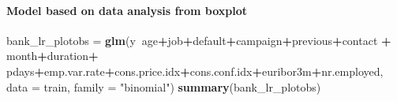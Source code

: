 \documentclass[
]{article}
\newenvironment{Shaded}{\begin{snugshade}}{\end{snugshade}}
\newcommand{\DataTypeTok}[1]{\textcolor[rgb]{0.13,0.29,0.53}{#1}}
\newcommand{\KeywordTok}[1]{\textcolor[rgb]{0.13,0.29,0.53}{\textbf{#1}}}
\newcommand{\NormalTok}[1]{#1}
\newcommand{\OperatorTok}[1]{\textcolor[rgb]{0.81,0.36,0.00}{\textbf{#1}}}
\newcommand{\StringTok}[1]{\textcolor[rgb]{0.31,0.60,0.02}{#1}}
\begin{document}
\hypertarget{model-based-on-data-analysis-from-boxplot}{%
\paragraph{Model based on data analysis from
boxplot}\label{model-based-on-data-analysis-from-boxplot}}

\begin{Shaded}
\begin{Highlighting}[]
\NormalTok{bank_lr_plotobs =}\StringTok{ }\KeywordTok{glm}\NormalTok{(y}\OperatorTok{~}\NormalTok{age}\OperatorTok{+}\NormalTok{job}\OperatorTok{+}\NormalTok{default}\OperatorTok{+}\NormalTok{campaign}\OperatorTok{+}\NormalTok{previous}\OperatorTok{+}\NormalTok{contact }\OperatorTok{+}\StringTok{ }\NormalTok{month}\OperatorTok{+}\NormalTok{duration}\OperatorTok{+}\StringTok{ }\NormalTok{pdays}\OperatorTok{+}\NormalTok{emp.var.rate}\OperatorTok{+}\NormalTok{cons.price.idx}\OperatorTok{+}\NormalTok{cons.conf.idx}\OperatorTok{+}\NormalTok{euribor3m}\OperatorTok{+}\NormalTok{nr.employed, }\DataTypeTok{data =}\NormalTok{ train,}
                      \DataTypeTok{family =} \StringTok{"binomial"}\NormalTok{)}
\KeywordTok{summary}\NormalTok{(bank_lr_plotobs)}
\end{Highlighting}
\end{Shaded}
\end{document}

